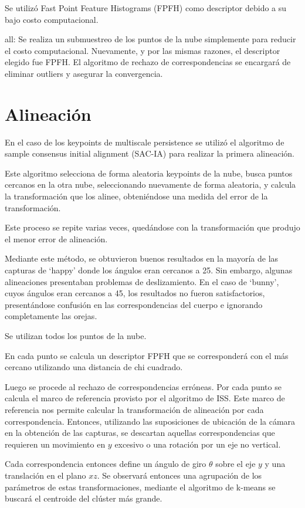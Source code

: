 		Se utilizó Fast Point Feature Histograms (FPFH) como descriptor debido a su bajo costo computacional.

		all:
		Se realiza un submuestreo de los puntos de la nube simplemente para
		reducir el costo computacional.
		Nuevamente, y por las mismas razones, el descriptor elegido fue FPFH.
		El algoritmo de rechazo de correspondencias se encargará de eliminar outliers y asegurar la convergencia.

	\section{Alineación}
	En el caso de los keypoints de multiscale persistence se utilizó el
	algoritmo de sample consensus initial alignment (SAC-IA) para realizar la
	primera alineación.

	Este algoritmo selecciona de forma aleatoria keypoints de la nube, busca
	puntos cercanos en la otra nube, seleccionando nuevamente de forma
	aleatoria, y calcula la transformación que los alinee, obteniéndose una
	medida del error de la transformación.

	Este proceso se repite varias veces, quedándose con la transformación que
	produjo el menor error de alineación.

	Mediante este método, se obtuvieron buenos resultados en la mayoría de las
	capturas de `happy' %
	donde los ángulos eran cercanos a 25. %
	Sin embargo, algunas alineaciones presentaban problemas de deslizamiento.
	En el caso de `bunny', cuyos ángulos eran cercanos a 45, %
	los resultados no fueron satisfactorios, presentándose confusión en las
	correspondencias del cuerpo e ignorando completamente las orejas.


	Se utilizan todos los puntos de la nube.

	En cada punto se calcula un descriptor FPFH que se corresponderá con el más
	cercano utilizando una distancia de chi cuadrado.

	Luego se procede al rechazo de correspondencias erróneas.
	Por cada punto se calcula el marco de referencia provisto por el algoritmo de ISS. %
	Este marco de referencia nos permite calcular la transformación de
	alineación por cada correspondencia.
	Entonces, utilizando las suposiciones de ubicación de la cámara en la
	obtención de las capturas, se descartan aquellas correspondencias que
	requieren un movimiento en $y$ excesivo o una rotación por un eje no
	vertical. 

	Cada correspondencia entonces define un ángulo de giro $\theta$ sobre el
	eje $y$ y una translación en el plano $xz$.
	Se observará entonces una agrupación de los parámetros de estas
	transformaciones, mediante el algoritmo de k-means se buscará el centroide
	del clúster más grande.

